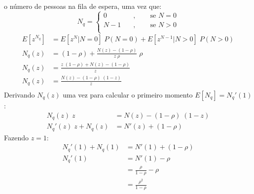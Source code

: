 \documentclass[a4paper]{article}
\newcommand{\E}[1]{E\!\left[#1\right]}
\begin{document}
o número de pessoas na fila de espera,
uma vez que:
\[
    N_q = \begin{cases}
                0 \quad&, \qquad\text{se } N = 0 \\
                N - 1 \quad&, \qquad\text{se } N > 0 \\    
        \end{cases}
\]
\begin{align*}
    \E{z^{N_q}} &= \E{z^N| N = 0} \; P(N = 0)
        + \E{z^{N-1} | N > 0} \;P(N > 0) \\
    N_q(z) &= (1 - \rho) + \frac{N(z) - (1 - \rho)}{z \; \rho}
        \; \rho \\
    N_q(z) &= \frac{z \; (1 - \rho) + N(z) - (1 - \rho)}{z} \\
    N_q(z) &= \frac{N(z) - (1 - \rho) \; (1 - z)}{z} \\
\end{align*}
Derivando \(N_q(z)\) uma vez para calcular o primeiro momento
\(\E{N_q} = N_q'(1)\):
\begin{align*}
    N_q(z) \; z &= N(z) - (1 - \rho) \; (1 - z) \\
    N_q'(z) \; z + N_q(z) &= N'(z) + (1 - \rho)
\end{align*}
Fazendo \(z = 1\):
\begin{align*}
    N_q'(1) + N_q(1) &= N'(1) + (1 - \rho) \\
    N_q'(1) &= N'(1) - \rho \\
    &= \frac{\rho}{1 - \rho} - \rho \\
    &= \frac{\rho^2}{1 - \rho}
\end{align*}
\end{document}

